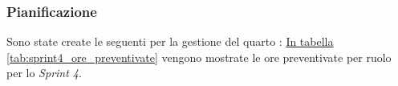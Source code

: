 \subsubsection{Pianificazione}
Sono state create le seguenti  per la gestione del quarto : 
\hyperref[tab:sprint4_ore_preventivate]{In tabella \ref{tab:sprint4_ore_preventivate}} vengono mostrate le ore preventivate per ruolo per lo \textit{Sprint 4}.

\begin{table}[H]
    \centering
    \caption{Ore preventivate per ruolo Sprint 4}
    \label{tab:sprint4_ore_preventivate}
\end{table}
